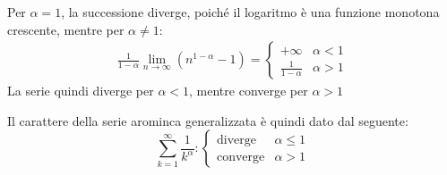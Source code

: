 \documentclass{article}
\numberwithin{equation}{subsection}
\begin{document}
Per $\alpha=1$, la successione diverge, poiché il logaritmo è una funzione monotona crescente, mentre per $\alpha\neq1$:
\begin{gather*}
    \displaystyle\frac{1}{1-\alpha}\lim_{n\to\infty}\left(n^{1-\alpha}-1\right)=\begin{cases}
        +\infty&\alpha<1\\
        \displaystyle\frac{1}{1-\alpha}&\alpha>1
    \end{cases}
\end{gather*}
La serie quindi diverge per $\alpha<1$, mentre converge per $\alpha>1$

Il carattere della serie arominca generalizzata è quindi dato dal seguente:
\begin{equation}
    \displaystyle\sum_{k=1}^\infty\frac{1}{k^\alpha}:\begin{cases}
        \text{diverge}&\alpha\le1\\
        \text{converge}&\alpha>1        
    \end{cases}
\end{equation}
\end{document}

